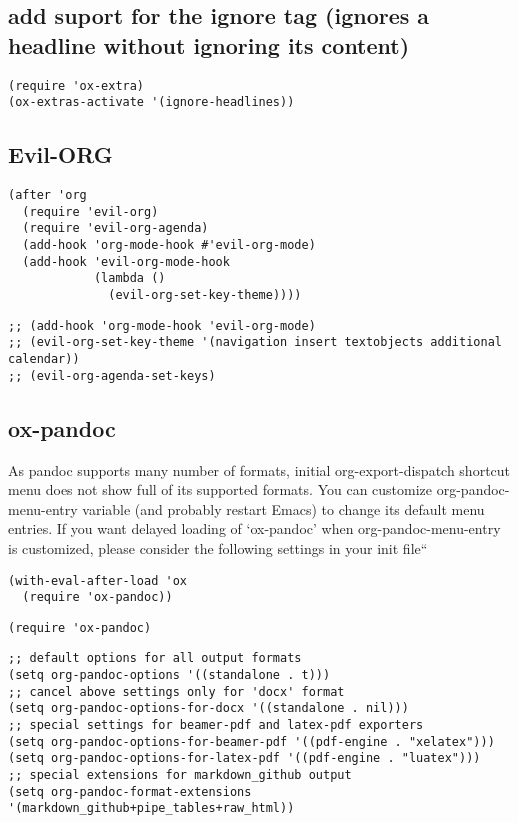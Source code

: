 \documentclass[11pt]{article}
\begin{document}
\subsection*{add suport for the ignore tag (ignores a headline without ignoring its content)}
\label{sec:orgd85509d}
\begin{verbatim}
(require 'ox-extra)
(ox-extras-activate '(ignore-headlines))
\end{verbatim}

\subsection*{Evil-ORG}
\label{sec:org8f41f40}

\begin{verbatim}
(after 'org
  (require 'evil-org)
  (require 'evil-org-agenda)
  (add-hook 'org-mode-hook #'evil-org-mode)
  (add-hook 'evil-org-mode-hook
            (lambda ()
              (evil-org-set-key-theme))))
\end{verbatim}

\begin{verbatim}
;; (add-hook 'org-mode-hook 'evil-org-mode)
;; (evil-org-set-key-theme '(navigation insert textobjects additional calendar))
;; (evil-org-agenda-set-keys)
\end{verbatim}

\subsection*{ox-pandoc}
\label{sec:org1761667}

As pandoc supports many number of formats, initial org-export-dispatch
shortcut menu does not show full of its supported formats. You can customize
org-pandoc-menu-entry variable (and probably restart Emacs) to change its
default menu entries.
If you want delayed loading of `ox-pandoc’ when org-pandoc-menu-entry
is customized, please consider the following settings in your init file``

\begin{verbatim}
(with-eval-after-load 'ox
  (require 'ox-pandoc))
\end{verbatim}

\begin{verbatim}
(require 'ox-pandoc)
\end{verbatim}

\begin{verbatim}
;; default options for all output formats
(setq org-pandoc-options '((standalone . t)))
;; cancel above settings only for 'docx' format
(setq org-pandoc-options-for-docx '((standalone . nil)))
;; special settings for beamer-pdf and latex-pdf exporters
(setq org-pandoc-options-for-beamer-pdf '((pdf-engine . "xelatex")))
(setq org-pandoc-options-for-latex-pdf '((pdf-engine . "luatex")))
;; special extensions for markdown_github output
(setq org-pandoc-format-extensions '(markdown_github+pipe_tables+raw_html))
\end{verbatim}
\end{document}
